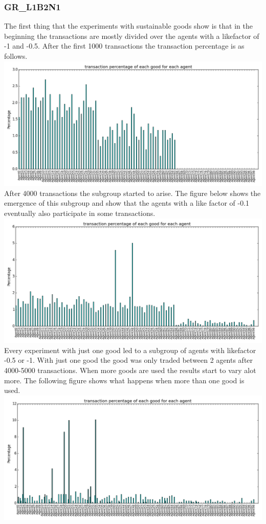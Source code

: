 \documentclass[twoside,openright]{uva-bachelor-thesis}
\begin{document}
\subsubsection{GR\_L1B2N1}
The first thing that the experiments with sustainable goods show is that in the beginning the transactions are mostly divided over the agents with a likefactor of -1 and -0.5. After the first 1000 transactions the transaction percentage is as follows. \\
\includegraphics[scale=0.4]{GR_L1B2N1/1000transactions} \\
After 4000 transactions the subgroup started to arise. The figure below shows the emergence of this subgroup and show that the agents with a like factor of -0.1 eventually also participate in some transactions. \\
\includegraphics[scale=0.4]{GR_L1B2N1/3-5ktransactions1good} \\
 Every experiment with just one good led to a subgroup of agents with likefactor -0.5 or -1. With just one good the good was only traded between 2 agents after 4000-5000 transactions. When more goods are used the results start to vary alot more. The following figure shows what happens when more than one good is used. \\
\includegraphics[scale=0.4]{GR_L1B2N1/3-5k_2goods_largergroups}
\end{document}
